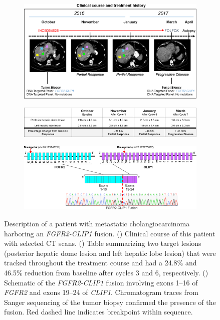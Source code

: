\begin{figure}[htp]
    \centering
    \begin{subfigure}{0.8\textwidth}
        \includegraphics[width=\textwidth,keepaspectratio]{images/240/clinical_course}
        \caption{}\label{fig:240:clinical_course}
    \end{subfigure}\par
    \begin{subfigure}{0.8\textwidth}
        \includegraphics[width=\textwidth,keepaspectratio]{images/240/recist}
        \caption{}\label{fig:240:recist}
    \end{subfigure}\par
    \begin{subfigure}{0.8\textwidth}
        \includegraphics[width=\textwidth,keepaspectratio]{images/240/fusion_schematic}
        \caption{}\label{fig:240:fusion_schematic}
    \end{subfigure}
    \vspace{-0.2cm}
    \caption[Description of a cholangiocarcinoma patient harboring an FGFR2-CLIP1 fusion.]{Description of a patient with metastatic cholangiocarcinoma harboring an \textit{FGFR2-CLIP1} fusion. () Clinical course of this patient with selected CT scans. () Table summarizing two target lesions (posterior hepatic dome lesion and left hepatic lobe lesion) that were tracked throughout the treatment course and had a 24.8\% and 46.5\% reduction from baseline after cycles 3 and 6, respectively. () Schematic of the \textit{FGFR2-CLIP1} fusion involving exons 1--16 of \textit{FGFR2} and exons 19--24 of \textit{CLIP1}. Chromatogram traces from Sanger sequencing of the tumor biopsy confirmed the presence of the fusion. Red dashed line indicates breakpoint within sequence.}

\end{figure}
